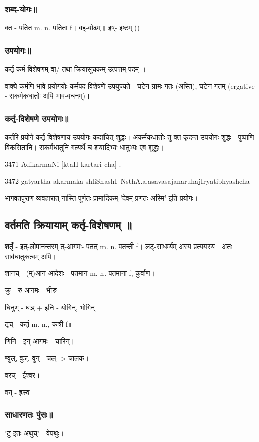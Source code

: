\documentclass[oneside, article]{memoir}
\begin{document}
\subsubsection{शब्द-योगः॥}
क्त - पतित m. n. पतिता f। वह्-वोढम्। इष्- इष्टम् ()। 

\subsubsection{उपयोगः॥}
कर्तृ-कर्म-विशेषणम् वा/ तथा क्रियासूचकम् उत्पत्तम् पदम् ।

वाक्ये कर्मणि-भावे-प्रयोगयोः कर्मपद-विशेषणे उपयुज्यते - घटेन ग्रामः गतः (अस्ति), घटेन गतम् (ergative - सकर्मकधातोः अपि भाव-वचनम्)। 

\subsubsection{कर्तृ-विशेषणे उपयोगः॥}
कर्तरि-प्रयोगे कर्तृ-विशेषणाय उपयोगः कदाचित् शुद्धः। अकर्मकधातोः तु क्त-कृदन्त-उपयोगः शुद्धः - पुष्पाणि विकसितानि। सकर्मधातुनि गत्यर्थे च शयादिभ्यः धातुभ्यः एव शुद्धः। 

3\.4\.71 AdikarmaNi [ktaH kartari cha] .

3\.4\.72
gatyartha-akarmaka-shliShashI~NsthA.a.asavasajanaruhajIryatibhyashcha

भागवतपुराण-व्यवहारात् नास्ति पूर्णतः प्रामादिकम् 'देवम् प्रणतः अस्मि' इति प्रयोगः।

\subsection{वर्तमति क्रियायाम् कर्तृ-विशेषणम् ॥}
शतृँ - इत्-लोपानन्तरम् त्-आगमः- पतत् m. n. पतन्ती f।  लट्-साधर्म्यम् अस्य प्रत्ययस्य। अतः सार्वधातुकत्वम् अपि।

शानच् - (म्)आन-आदेशः - पतमान m. n. पतमाना f, कुर्वाण।

क्रु - रु-आगमः - भीरु।

घिनुण् - घञ् + इनि - योगिन्, भोगिन्।

तृच् - कर्तृ m. n., कत्री f॥

णिनि - इन्-आगमः - चारिन्।

ण्वुल्, वुञ्, वुन् - चल् -> चालक।

वरच् - ईश्वर।

वन् - ह्रस्व

\subsubsection{साधारणतः पुंसः॥}
'टु-इतः अथुच्' - वेपथुः।
\end{document}
